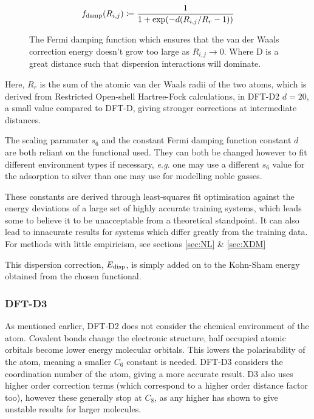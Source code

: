 \documentclass[10pt,a4paper,twocolumn,twoside]{extarticle}
\begin{document}
	\begin{align} \label{eq:damp}
		f_{\rm damp}(R_{i,j}) \coloneqq \frac{1}{1+\exp(-d(R_{i,j}/R_r -1))}
	\end{align}

	\begin{figure}
		\caption{The Fermi damping function which ensures that the van der Waals correction energy doesn't grow too large as $R_{i,j} \rightarrow 0$. Where D is a great distance such that dispersion interactions will dominate.}
		\label{fig:Fermi}
	\end{figure}
	Here, $R_r$ is the sum of the atomic van der Waals radii of the two atoms, which is derived from Restricted Open-shell Hartree-Fock calculations, in DFT-D2 $d = 20$, a small value compared to DFT-D, giving stronger corrections at intermediate distances. 

	The scaling paramater $s_6$ and the constant Fermi damping function constant $d$ are both reliant on the functional used. They can both be changed however to fit different environment types if necessary, \emph{e.g.} one may use a different $s_6$ value for the adsorption to silver\cite{Schiavo2018} than one may use for modelling noble gasses.  

	These constants are derived through least-squares fit optimisation against the energy deviations of a large set of highly accurate training systems, which leads some to believe it to be unacceptable from a theoretical standpoint. It can also lead to innacurate results for systems which differ greatly from the training data.\cite{Sato2009}\cite{Grimme2010}\cite{Jones2015} For methods with little empiricism, see sections \ref{sec:NL} \& \ref{sec:XDM}

	This dispersion correction, $E_{\rm disp}$, is simply added on to the Kohn-Sham energy obtained from the chosen functional.


	\subsubsection{DFT-D3}
	\label{sec:D3}
	As mentioned earlier, DFT-D2 does not consider the chemical environment of the atom. Covalent bonds change the electronic structure, half occupied atomic orbitals become lower energy molecular orbitals. This lowers the polarisability of the atom, meaning a smaller $C_6$ constant is needed. DFT-D3 considers the coordination number of the atom, giving a more accurate result. \cite{Grimme2010} D3 also uses higher order correction terms (which correspond to a higher order distance factor too), however these generally stop at $C_8$, as any higher has shown to give unstable results for larger molecules.
\end{document}
